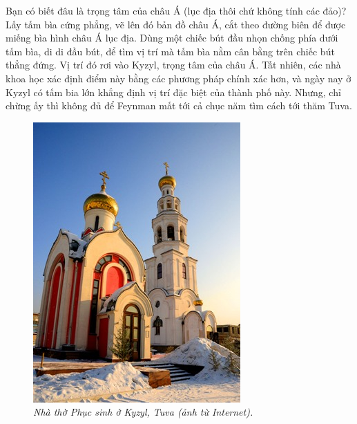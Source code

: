 \begin{multicols}{2}
	\vskip 0.1cm
	Bạn có biết đâu là trọng tâm của châu Á (lục địa thôi chứ không tính các đảo)? Lấy tấm bìa cứng phẳng, vẽ lên đó bản đồ châu Á, cắt theo đường biên để được miếng bìa hình châu Á lục địa. Dùng một chiếc bút đầu nhọn chống phía dưới tấm bìa, di di đầu bút, để tìm vị trí mà tấm bìa nằm cân bằng trên chiếc bút thẳng đứng. Vị trí đó rơi vào Kyzyl, trọng tâm của châu Á. Tất nhiên, các nhà khoa học xác định điểm này bằng các phương pháp chính xác hơn, và ngày nay ở Kyzyl có tấm bia lớn khẳng định vị trí đặc biệt của thành phố này. Nhưng, chỉ chừng ấy thì không đủ để Feynman mất tới cả chục năm tìm cách tới thăm Tuva.
	\begin{figure}[H]
			\vspace*{-5pt}
			\centering
			\captionsetup{labelformat= empty, justification=centering}
			\includegraphics[width= 1\linewidth]{4a}
			\caption{\small\textit{\color{quantoan}Nhà thờ Phục sinh ở Kyzyl, Tuva (ảnh từ Internet).}}
			\vspace*{-10pt}

\end{figure}
\end{multicols}
